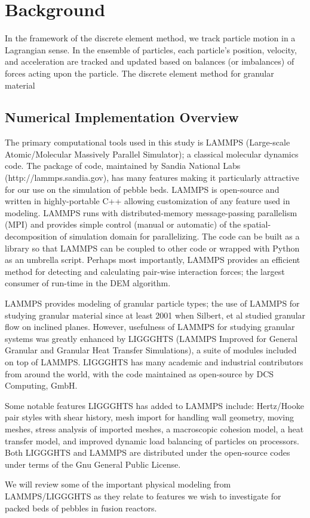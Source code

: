 \section{Background}
\label{intro}



In the framework of the discrete element method, we track particle motion in a Lagrangian sense. In the ensemble of particles, each particle's position, velocity, and acceleration are tracked and updated based on balances (or imbalances) of forces acting upon the particle. The discrete element method for granular material 

\subsection{Numerical Implementation Overview}

The primary computational tools used in this study is LAMMPS (Large-scale Atomic/Molecular Massively Parallel Simulator)\cite{Plimpton1995}; a classical molecular dynamics code. The package of code, maintained by Sandia National Labs (http://lammps.sandia.gov), has many features making it particularly attractive for our use on the simulation of pebble beds. LAMMPS is open-source and written in highly-portable C++ allowing customization of any feature used in modeling. LAMMPS runs with distributed-memory message-passing parallelism (MPI) and provides simple control (manual or automatic) of the spatial-decomposition of simulation domain for parallelizing. The code can be built as a library so that LAMMPS can be coupled to other code or wrapped with Python as an umbrella script. Perhaps most importantly, LAMMPS provides an efficient method for detecting and calculating pair-wise interaction forces; the largest consumer of run-time in the DEM algorithm\cite{Plimpton1995}.

LAMMPS provides modeling of granular particle types; the use of LAMMPS for studying granular material since at least 2001 when Silbert, et al\cite{Silbert2001} studied granular flow on inclined planes. However, usefulness of LAMMPS for studying granular systems was greatly enhanced by LIGGGHTS (LAMMPS Improved for General Granular and Granular Heat Transfer Simulations), a suite of modules included on top of LAMMPS. LIGGGHTS has many academic and industrial contributors from around the world, with the code maintained as open-source by DCS Computing, GmbH.

Some notable features LIGGGHTS has added to LAMMPS include: Hertz/Hooke pair styles with shear history, mesh import for handling wall geometry, moving meshes, stress analysis of imported meshes, a macroscopic cohesion model, a heat transfer model, and improved dynamic load balancing of particles on processors\cite{Kloss2011}. Both LIGGGHTS and LAMMPS are distributed under the open-source codes under terms of the Gnu General Public License.

We will review some of the important physical modeling from LAMMPS/LIGGGHTS as they relate to features we wish to investigate for packed beds of pebbles in fusion reactors.